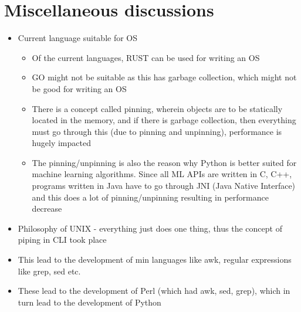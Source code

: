 \documentclass[10pt]{article}
\begin{document}
\section{Miscellaneous discussions}
\begin{itemize}
\item Current language suitable for OS
\begin{itemize}
\item Of the current languages, RUST can be used for writing an OS
\item GO might not be suitable as this has garbage collection, which might not be good for writing an OS
\item There is a concept called pinning, wherein objects are to be statically located in the memory, and if there is garbage collection, then everything must go through this (due to pinning and unpinning), performance is hugely impacted
\item The pinning/unpinning is also the reason why Python is better suited for machine learning algorithms. Since all ML APIs are written in C, C++, programs written in Java have to go through JNI (Java Native Interface) and this does a lot of pinning/unpinning resulting in performance decrease
\end{itemize}
\item Philosophy of UNIX - everything just does one thing, thus the concept of piping in CLI took place
\item This lead to the development of min languages like awk, regular expressions like grep, sed etc.
\item These lead to the development of Perl (which had awk, sed, grep), which in turn lead to the development of Python
\end{itemize}
\end{document}
